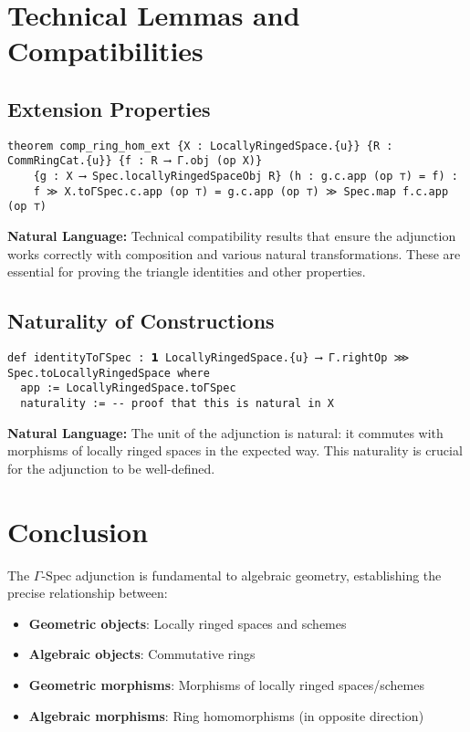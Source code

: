 \documentclass{article}
\theoremstyle{definition}
\begin{document}
{\section{Technical Lemmas and Compatibilities}

\subsection{Extension Properties}

\begin{lstlisting}
theorem comp_ring_hom_ext {X : LocallyRingedSpace.{u}} {R : CommRingCat.{u}} {f : R ⟶ Γ.obj (op X)}
    {g : X ⟶ Spec.locallyRingedSpaceObj R} (h : g.c.app (op ⊤) = f) :
    f ≫ X.toΓSpec.c.app (op ⊤) = g.c.app (op ⊤) ≫ Spec.map f.c.app (op ⊤)
\end{lstlisting}

\textbf{Natural Language:} Technical compatibility results that ensure the adjunction works correctly with composition and various natural transformations. These are essential for proving the triangle identities and other properties.

\subsection{Naturality of Constructions}

\begin{lstlisting}
def identityToΓSpec : 𝟭 LocallyRingedSpace.{u} ⟶ Γ.rightOp ⋙ Spec.toLocallyRingedSpace where
  app := LocallyRingedSpace.toΓSpec
  naturality := -- proof that this is natural in X
\end{lstlisting}

\textbf{Natural Language:} The unit of the adjunction is natural: it commutes with morphisms of locally ringed spaces in the expected way. This naturality is crucial for the adjunction to be well-defined.

\section{Conclusion}

The $\Gamma$-$\mathrm{Spec}$ adjunction is fundamental to algebraic geometry, establishing the precise relationship between:

\begin{itemize}
\item \textbf{Geometric objects}: Locally ringed spaces and schemes  
\item \textbf{Algebraic objects}: Commutative rings
\item \textbf{Geometric morphisms}: Morphisms of locally ringed spaces/schemes
\item \textbf{Algebraic morphisms}: Ring homomorphisms (in opposite direction)
\end{itemize}

}
\end{document}

